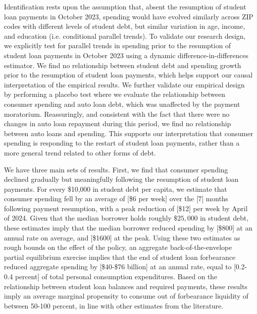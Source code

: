 \documentclass[12pt]{article}
\begin{document}
Identification rests upon the assumption that, absent the resumption of student loan payments in October 2023, spending would have evolved similarly across ZIP codes with different levels of student debt, but similar variation in age, income, and education (i.e. conditional parallel trends). 
To validate our research design, we explicitly test for parallel trends in spending prior to the resumption of student loan payments in October 2023 using a dynamic difference-in-differences estimator. 
We find no relationship between student debt and spending growth prior to the resumption of student loan payments, which helps support our causal interpretation of the empirical results. 
We further validate our empirical design by performing a placebo test where we evaluate the relationship between consumer spending and auto loan debt, which was unaffected by the payment moratorium. Reassuringly, and consistent with the fact that there were no changes in auto loan repayment during this period, we find no relationship between auto loans and spending. This supports our interpretation that consumer spending is responding to the restart of student loan payments, rather than a more general trend related to other forms of debt.

We have three main sets of results. First, we find that consumer spending declined gradually but meaningfully following the resumption of student loan payments. For every \$10,000 in student debt per capita, we estimate that consumer spending fell by an average of [\$6 per week] over the [7] months following payment resumption, with a peak reduction of [\$12] per week by April of 2024. Given that the median borrower holds roughly $\$25,000$ in student debt, these estimates imply that the median borrower reduced spending by [\$800] at an annual rate on average, and [\$1600] at the peak. Using these two estimates as rough bounds on the effect of the policy, an aggregate back-of-the-envelope partial equilibrium exercise implies that the end of student loan forbearance reduced aggregate spending by [\$40-\$76 billion] at an annual rate, equal to [0.2-0.4 percent] of total personal consumption expenditures. Based on the relationship between student loan balances and required payments, these results imply an average marginal propensity to consume out of forbearance liquidity of between 50-100 percent, in line with other estimates from the literature.
\end{document}
